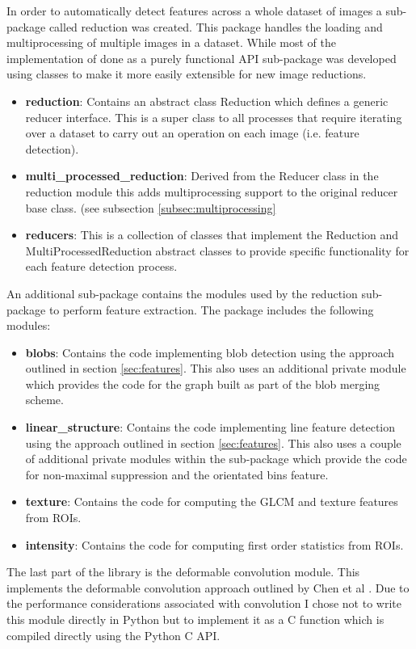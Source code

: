 In order to automatically detect features across a whole dataset of images a sub-package called reduction was created. This package handles the loading and multiprocessing of multiple images in a dataset. While most of the implementation of done as a purely functional API sub-package was developed using classes to make it more easily extensible for new image reductions.

\begin{itemize}
	\item {\bf reduction}: Contains an abstract class Reduction which defines a generic reducer interface. This is a super class to all processes that require iterating over a dataset to carry out an operation on each image (i.e. feature detection).
	\item {\bf multi\_processed\_reduction}: Derived from the Reducer class in the reduction module this adds multiprocessing support to the original reducer base class. (see subsection \ref{subsec:multiprocessing}
	\item {\bf reducers}: This is a collection of classes that implement the Reduction and MultiProcessedReduction abstract classes to provide specific functionality for each feature detection process.
\end{itemize}

An additional sub-package contains the modules used by the reduction sub-package to perform feature extraction. The package includes the following modules:

\begin{itemize}
	\item {\bf blobs}: Contains the code implementing blob detection using the approach outlined in section \ref{sec:features}. This also uses an additional private module which provides the code for the graph built as part of the blob merging scheme.
	\item {\bf linear\_structure}: Contains the code implementing line feature detection using the approach outlined in section \ref{sec:features}. This also uses a couple of additional private modules within the sub-package which provide the code for non-maximal suppression and the orientated bins feature. 
	\item {\bf texture}: Contains the code for computing the GLCM and texture features from ROIs.
	\item {\bf intensity}: Contains the code for computing first order statistics from ROIs.
\end{itemize}

The last part of the library is the deformable convolution module. This implements the deformable convolution approach outlined by Chen et al \cite{chen2013multiscale}. Due to the performance considerations associated with convolution I chose not to write this module directly in Python but to implement it as a C function which is compiled directly using the Python C API.


